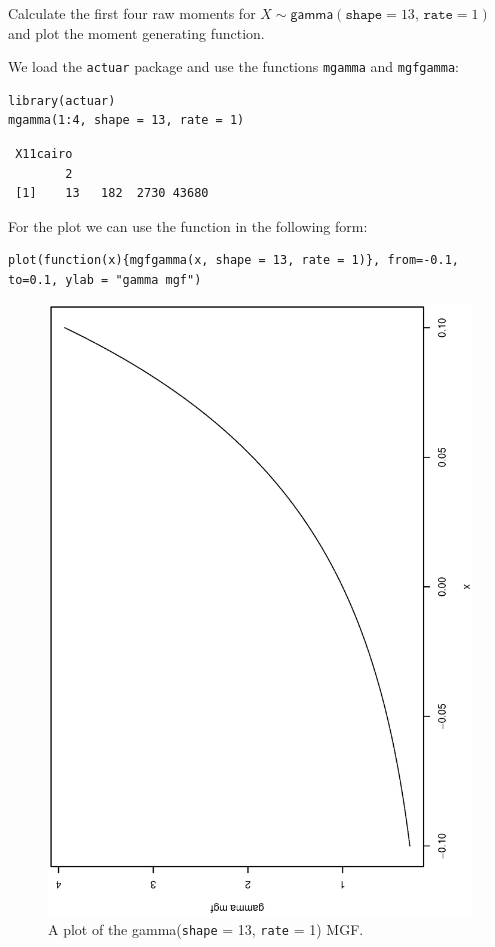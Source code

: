 \documentclass[captions=tableheading]{scrbook}
\begin{document}
\begin{example}
Calculate the first four raw moments for \(X\sim\mathsf{gamma}(\mathtt{shape}=13,\,\mathtt{rate}=1)\) and plot the moment generating function.

We load the \texttt{actuar} package and use the functions \texttt{mgamma} and \texttt{mgfgamma}:

\begin{verbatim}
library(actuar)
mgamma(1:4, shape = 13, rate = 1)
\end{verbatim}

\begin{verbatim}
 X11cairo 
        2
 [1]    13   182  2730 43680
\end{verbatim}

For the plot we can use the function in the following form:


\begin{verbatim}
plot(function(x){mgfgamma(x, shape = 13, rate = 1)}, from=-0.1, to=0.1, ylab = "gamma mgf")
\end{verbatim}





\begin{figure}[th]
  \includegraphics[angle=270, totalheight=4in]{ps/gamma-mgf.ps}
  \caption[Plot of the \textsf{gamma}(\texttt{shape} = 13, \texttt{rate} = 1) MGF]{\small A plot of the \textsf{gamma}(\texttt{shape} = 13, \texttt{rate} = 1) MGF.}
  \label{fig:gamma-mgf}
\end{figure}


\end{example}
\end{document}
